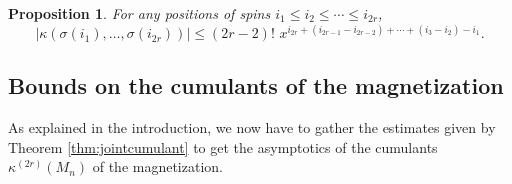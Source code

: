 \documentclass[12pt,a4paper,reqno]{amsart}
\newtheorem{proposition}[theorem]{Proposition}
\theoremstyle{remark}
\begin{document}
\begin{proposition}
For any positions of spins $i_1\leq i_2 \leq \cdots \leq i_{2r}$, 
$$\left|\kappa(\sigma(i_1),\ldots,\sigma(i_{2r})) \right|\leq (2r-2)!\,\, x^{i_{2r}+(i_{2r-1}-i_{2r-2})+\cdots+(i_{3}-i_{2})-i_{1}}.$$
\end{proposition}
\medskip



\subsection{Bounds on the cumulants of the magnetization}
As explained in the introduction, we now have to gather the estimates given by Theorem \ref{thm:jointcumulant} to get the asymptotics of the cumulants $\kappa^{(2r)}(M_n)$ of the magnetization. 
\end{document}
